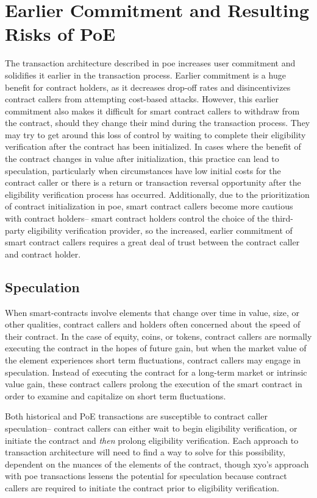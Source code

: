 \documentclass{article}
\begin{document}
\section{Earlier Commitment and Resulting Risks of PoE}
The transaction architecture described in \acrlong{poe} increases user commitment and solidifies it earlier in the transaction process. Earlier commitment is a huge benefit for contract holders, as it decreases drop-off rates and disincentivizes contract callers from attempting cost-based attacks. However, this earlier commitment also makes it difficult for smart contract callers to withdraw from the contract, should they change their mind during the transaction process. They may try to get around this loss of control by waiting to complete their eligibility verification after the contract has been initialized. In cases where the benefit of the contract changes in value after initialization, this practice can lead to speculation, particularly when circumstances have low initial costs for the contract caller or there is a return or transaction reversal opportunity after the eligibility verification process has occurred. Additionally, due to the prioritization of contract initialization in \acrshort{poe}, smart contract callers become more cautious with contract holders-- smart contract holders control the choice of the third-party eligibility verification provider, so the increased, earlier commitment of smart contract callers requires a great deal of trust between the contract caller and contract holder.

\subsection{Speculation}
When \glspl{smart-contract} involve elements that change over time in value, size, or other qualities, contract callers and holders often concerned about the speed of their contract. In the case of equity, coins, or tokens, contract callers are normally executing the contract in the hopes of future gain, but when the market value of the element experiences short term fluctuations, contract callers may engage in speculation. Instead of executing the contract for a long-term market or intrinsic value gain, these contract callers prolong the execution of the smart contract in order to examine and capitalize on short term fluctuations.

Both historical and PoE transactions are susceptible to contract caller speculation-- contract callers can either wait to begin eligibility verification, or initiate the contract and \textit{then} prolong eligibility verification. Each approach to transaction architecture will need to find a way to solve for this possibility, dependent on the nuances of the elements of the contract, though \acrlong{xyo}'s approach with \acrlong{poe} transactions lessens the potential for speculation because contract callers are required to initiate the contract prior to eligibility verification. 
\end{document}

